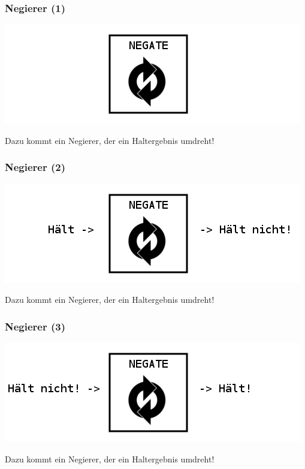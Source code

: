 \documentclass[aspectratio=43]{beamer}
\begin{document}

\begin{frame}
\frametitle{Negierer (1)}
\begin{center}
\includegraphics[scale=1.4]{images/erklaerung04.png} 
\bigskip

Dazu kommt ein Negierer, der ein Haltergebnis umdreht!
\end{center}
\end{frame}


\begin{frame}
\frametitle{Negierer (2)}
\begin{center}
\includegraphics[scale=1.4]{images/erklaerung05.png}
\bigskip

Dazu kommt ein Negierer, der ein Haltergebnis umdreht!
\end{center}
\end{frame}


\begin{frame}
\frametitle{Negierer (3)}
\begin{center}
\includegraphics[scale=1.4]{images/erklaerung06.png}
\bigskip

Dazu kommt ein Negierer, der ein Haltergebnis umdreht!
\end{center}
\end{frame}
\end{document}

